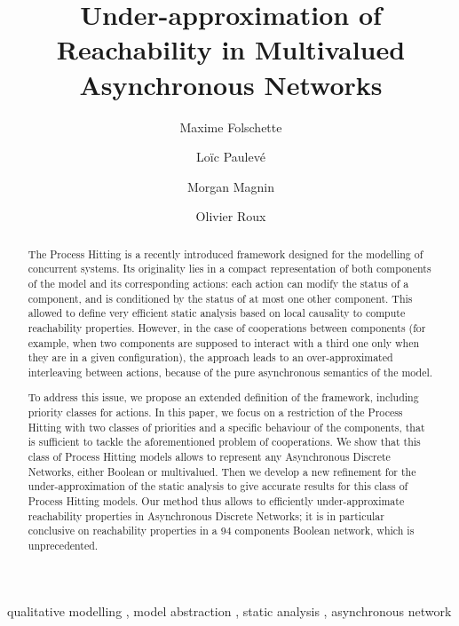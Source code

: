 \documentclass{elsarticle}
\begin{document}
\begin{frontmatter}
\title{Under-approximation of Reachability in Multivalued Asynchronous Networks}

\author[irccyn]{Maxime Folschette}
\author[eth]{Loïc Paulevé}
\author[irccyn]{Morgan Magnin}
\author[irccyn]{Olivier Roux}

\address[irccyn]{LUNAM Universit\'e, \'Ecole Centrale de Nantes, IRCCyN UMR CNRS 6597\\
(Institut de Recherche en Communications et Cybern\'etique de Nantes)\\
1 rue de la No\"e - B.P. 92101 - 44321 Nantes Cedex 3, France.}

\address[eth]{BISON group, Automatic Control Laboratory, ETH Zürich\\
Physikstrasse 3, 8092 Zurich, Switzerland.}



\begin{abstract}
The Process Hitting is a recently introduced framework designed for the modelling of concurrent systems.
Its originality lies in a compact representation of both components of the model and its corresponding actions:
each action can modify the status of a component, and is conditioned by the status of at most one other component.
This allowed to define very efficient static analysis based on local causality to compute reachability properties.
However, in the case of cooperations between components (for example, when two components are supposed to interact with a third one only when they are in a given configuration), the approach leads to an over-approximated interleaving between actions, because of the pure asynchronous semantics of the model.

To address this issue, we propose an extended definition of the framework, including priority classes for actions.
In this paper, we focus on a restriction of the Process Hitting with two classes of priorities and a specific behaviour of the components, that is sufficient to tackle the aforementioned problem of cooperations.
We show that this class of Process Hitting models allows to represent any Asynchronous Discrete Networks, either Boolean or multivalued.
Then we develop a new refinement for the under-approximation of the static analysis to give accurate results for this class of Process Hitting models.
Our method thus allows to efficiently under-approximate reachability properties in Asynchronous Discrete Networks;
it is in particular conclusive on reachability properties in a 94 components Boolean network, which is unprecedented.
\end{abstract}
\begin{keyword}
qualitative modelling \sep
model abstraction \sep
static analysis \sep
asynchronous network
\end{keyword}
\end{frontmatter}



















\end{document}

